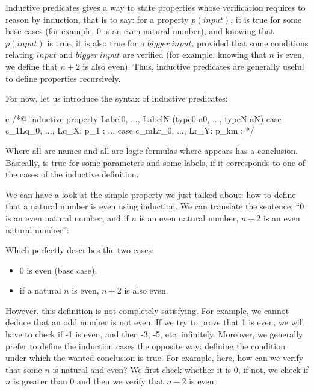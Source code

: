 Inductive predicates gives a way to state properties whose verification requires
to reason by induction, that is to say: for a property $p(input)$, it is true
for some base cases (for example, $0$ is an even natural number), and knowing
that $p(input)$ is true, it is also true for a $bigger\ input$, provided that
some conditions relating $input$ and $bigger\ input$ are verified (for example,
knowing that $n$ is even, we define that $n+2$ is also even). Thus, inductive
predicates are generally useful to define properties recursively.


For now, let us introduce the syntax of inductive predicates:

\begin{CodeBlock}{c}
/*@
  inductive property{ Label0, ..., LabelN }(type0 a0, ..., typeN aN) {
  case c_1{Lq_0, ..., Lq_X}: p_1 ;
  ...
  case c_m{Lr_0, ..., Lr_Y}: p_km ;
  }
*/
\end{CodeBlock}

Where all  are names and all  are logic
formulas where  appears has a conclusion. Basically,
 is true for some parameters and some labels, if it
corresponds to one of the cases of the inductive definition.

We can have a look at the simple property we just talked about: how to define
that a natural number is even using induction. We can translate the sentence:
``0 is an even natural number, and if $n$ is an even natural number, $n+2$ is
an even natural number'':






Which perfectly describes the two cases:
\begin{itemize}
\item $0$ is even (base case),
\item if a natural $n$ is even, $n+2$ is also even.
\end{itemize}

However, this definition is not completely satisfying. For example, we cannot
deduce that an odd number is not even. If we try to prove that 1 is even, we
will have to check if -1 is even, and then -3, -5, etc, infinitely. Moreover,
we generally prefer to define the induction cases the opposite way: defining
the condition under which the wanted conclusion is true. For example, here,
how can we verify that some $n$ is natural and even? We first check whether it
is 0, if not, we check if $n$ is greater than $0$ and then we verify that $n-2$
is even:



